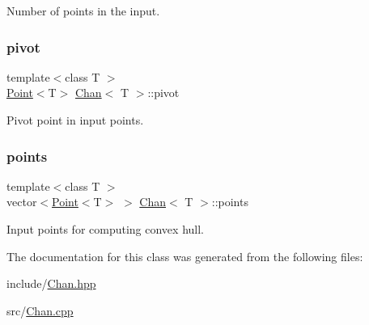 Number of points in the input. 

\mbox{\label{classChan_a601408ef7e50863dd345e86e519710bc}} 
\subsubsection{\texorpdfstring{pivot}{pivot}}
{\footnotesize\ttfamily template$<$class T $>$ \\
\mbox{\hyperlink{classPoint}{Point}}$<$T$>$ \mbox{\hyperlink{classChan}{Chan}}$<$ T $>$\+::pivot\hspace{0.3cm}{\ttfamily [private]}}



Pivot point in input points. 

\mbox{\label{classChan_a492d7e3f31f1fd1e06f5ff464eec0492}} 
\subsubsection{\texorpdfstring{points}{points}}
{\footnotesize\ttfamily template$<$class T $>$ \\
vector$<$\mbox{\hyperlink{classPoint}{Point}}$<$T$>$ $>$ \mbox{\hyperlink{classChan}{Chan}}$<$ T $>$\+::points\hspace{0.3cm}{\ttfamily [private]}}



Input points for computing convex hull. 



The documentation for this class was generated from the following files\+:\begin{DoxyCompactItemize}
\item 
include/\mbox{\hyperlink{Chan_8hpp}{Chan.\+hpp}}\item 
src/\mbox{\hyperlink{Chan_8cpp}{Chan.\+cpp}}\end{DoxyCompactItemize}

